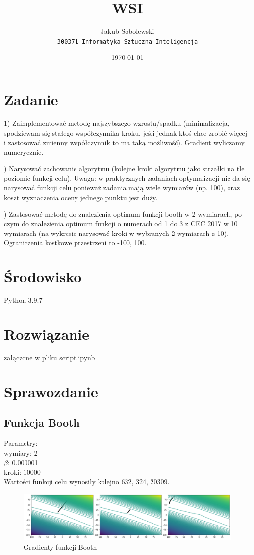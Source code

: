 \documentclass{article}
\title{WSI} %
\author{Jakub Sobolewski\\ \texttt{300371 Informatyka Sztuczna Inteligencja}}
\date{\today}
\begin{document}
\maketitle

\section*{Zadanie} %
1) Zaimplementować metodę najszybszego wzrostu/spadku (minimalizacja, spodziewam się stałego współczynnika kroku, jeśli jednak ktoś chce zrobić więcej i zastosować zmienny współczynnik to ma taką możliwość). Gradient wyliczamy numerycznie.

) Narysować zachowanie algorytmu (kolejne kroki algorytmu jako strzałki na tle poziomic funkcji celu). Uwaga: w praktycznych zadaniach optymalizacji nie da się narysować funkcji celu ponieważ zadania mają wiele wymiarów (np. 100), oraz koszt wyznaczenia oceny jednego punktu jest duży.

) Zastosować metodę do znalezienia optimum funkcji booth w 2 wymiarach, po czym do znalezienia optimum funkcji o numerach od 1 do 3 z CEC 2017 w 10 wymiarach (na wykresie narysować kroki w wybranych 2 wymiarach z 10). Ograniczenia kostkowe przestrzeni to -100, 100.

\section*{Środowisko}
Python 3.9.7

\section*{Rozwiązanie}
załączone w pliku script.ipynb

\section*{Sprawozdanie}

\subsection*{Funkcja Booth}
Parametry:\\
wymiary: 2\\
$\beta$: 0.000001\\
kroki: 10000\\

\noindent Wartości funkcji celu wynosiły kolejno 632, 324, 20309.
\begin{figure}[!h]
    \centering \includegraphics[width=\linewidth]{booth.pdf}
    \caption{Gradienty funkcji Booth}
\end{figure}
\end{document}
